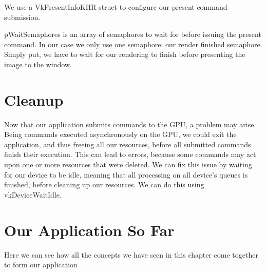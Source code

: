 \begin{minipage}{\linewidth}{\noindent}
    
\end{minipage}

We use a VkPresentInfoKHR struct to configure our present command submission.

pWaitSemaphores is an array of semaphores to wait for before issuing the present
command.
In our case we only use one semaphore: our render finished semaphore.
Simply put, we have to wait for our rendering to finish before presenting
the image to the window.

\begin{minipage}{\linewidth}{\noindent}
    
\end{minipage}

\section{Cleanup}

Now that our application submits commands to the GPU, a problem may arise.
Being commands executed asynchronously on the GPU, we could exit the application,
and thus freeing all our resources, before all submitted commands finish
their execution.
This can lead to errors, because some commands may act upon one or more resources
that were deleted.
We can fix this issue by waiting for our device to be idle, meaning that
all processing on all device's queues is finished, before cleaning up our resources.
We can do this using vkDeviceWaitIdle.

\section{Our Application So Far}

Here we can see how all the concepts we have seen in this chapter come together
to form our application

\begin{minipage}{\linewidth}{\noindent}
    
\end{minipage}

